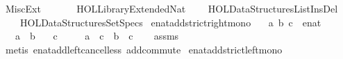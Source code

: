 %
\begin{isabellebody}%
%
%
\isadelimtheory
%
\endisadelimtheory
%
\isatagtheory
{}\isamarkupfalse%
\ Misc{\isacharunderscore}{\kern0pt}Ext\isanewline
\ \ \isanewline
\ \ \ \ {\isachardoublequoteopen}HOL{\isacharminus}{\kern0pt}Library{\isachardot}{\kern0pt}Extended{\isacharunderscore}{\kern0pt}Nat{\isachardoublequoteclose}\isanewline
\ \ \ \ {\isachardoublequoteopen}HOL{\isacharminus}{\kern0pt}Data{\isacharunderscore}{\kern0pt}Structures{\isachardot}{\kern0pt}List{\isacharunderscore}{\kern0pt}Ins{\isacharunderscore}{\kern0pt}Del{\isachardoublequoteclose}\isanewline
\ \ \ \ {\isachardoublequoteopen}HOL{\isacharminus}{\kern0pt}Data{\isacharunderscore}{\kern0pt}Structures{\isachardot}{\kern0pt}Set{\isacharunderscore}{\kern0pt}Specs{\isachardoublequoteclose}\isanewline
{}%
\endisatagtheory
{\isafoldtheory}%
%
\isadelimtheory
%
\endisadelimtheory
%
\isadelimdocument
%
\endisadelimdocument
%
\isatagdocument
%
\isamarkuptrue%
%
\endisatagdocument
{\isafolddocument}%
%
\isadelimdocument
%
\endisadelimdocument
{}\isamarkupfalse%
\ enat{\isacharunderscore}{\kern0pt}add{\isacharunderscore}{\kern0pt}strict{\isacharunderscore}{\kern0pt}right{\isacharunderscore}{\kern0pt}mono{\isacharcolon}{\kern0pt}\isanewline
\ \ \ a\ b\ c\ {\isacharcolon}{\kern0pt}{\isacharcolon}{\kern0pt}\ enat\isanewline
\ \ \ {\isachardoublequoteopen}a\ {\isacharless}{\kern0pt}\ b{\isachardoublequoteclose}\isanewline
\ \ \ {\isachardoublequoteopen}c\ {\isasymnoteq}\ {\isasyminfinity}{\isachardoublequoteclose}\isanewline
\ \ \ {\isachardoublequoteopen}a\ {\isacharplus}{\kern0pt}\ c\ {\isacharless}{\kern0pt}\ b\ {\isacharplus}{\kern0pt}\ c{\isachardoublequoteclose}\isanewline
%
\isadelimproof
\ \ %
\endisadelimproof
%
\isatagproof
{}\isamarkupfalse%
\ assms\isanewline
\ \ \isamarkupfalse%
\ {\isacharparenleft}{\kern0pt}metis\ enat{\isacharunderscore}{\kern0pt}add{\isacharunderscore}{\kern0pt}left{\isacharunderscore}{\kern0pt}cancel{\isacharunderscore}{\kern0pt}less\ add{\isachardot}{\kern0pt}commute{\isacharparenright}{\kern0pt}%
\endisatagproof
{\isafoldproof}%
%
\isadelimproof
\isanewline
%
\endisadelimproof
\isanewline
{}\isamarkupfalse%
\ enat{\isacharunderscore}{\kern0pt}add{\isacharunderscore}{\kern0pt}strict{\isacharunderscore}{\kern0pt}left{\isacharunderscore}{\kern0pt}mono{\isacharcolon}{\kern0pt}\isanewline

\end{isabellebody}
